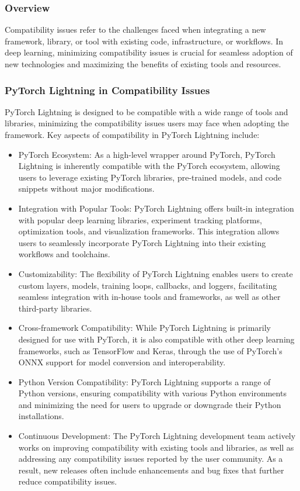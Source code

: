 \documentclass[12pt]{article}
\begin{document}
\subsubsection{Overview}

Compatibility issues refer to the challenges faced when integrating a new framework, library, or tool with existing code, infrastructure, or workflows. In deep learning, minimizing compatibility issues is crucial for seamless adoption of new technologies and maximizing the benefits of existing tools and resources.

\subsubsection{PyTorch Lightning in Compatibility Issues}

PyTorch Lightning is designed to be compatible with a wide range of tools and libraries, minimizing the compatibility issues users may face when adopting the framework. Key aspects of compatibility in PyTorch Lightning include:

\begin{itemize}
    \item PyTorch Ecosystem: As a high-level wrapper around PyTorch, PyTorch Lightning is inherently compatible with the PyTorch ecosystem, allowing users to leverage existing PyTorch libraries, pre-trained models, and code snippets without major modifications.
    \item Integration with Popular Tools: PyTorch Lightning offers built-in integration with popular deep learning libraries, experiment tracking platforms, optimization tools, and visualization frameworks. This integration allows users to seamlessly incorporate PyTorch Lightning into their existing workflows and toolchains.
    \item Customizability: The flexibility of PyTorch Lightning enables users to create custom layers, models, training loops, callbacks, and loggers, facilitating seamless integration with in-house tools and frameworks, as well as other third-party libraries.
    \item Cross-framework Compatibility: While PyTorch Lightning is primarily designed for use with PyTorch, it is also compatible with other deep learning frameworks, such as TensorFlow and Keras, through the use of PyTorch's ONNX support for model conversion and interoperability.
    \item Python Version Compatibility: PyTorch Lightning supports a range of Python versions, ensuring compatibility with various Python environments and minimizing the need for users to upgrade or downgrade their Python installations.
    \item Continuous Development: The PyTorch Lightning development team actively works on improving compatibility with existing tools and libraries, as well as addressing any compatibility issues reported by the user community. As a result, new releases often include enhancements and bug fixes that further reduce compatibility issues.
\end{itemize}
\end{document}
